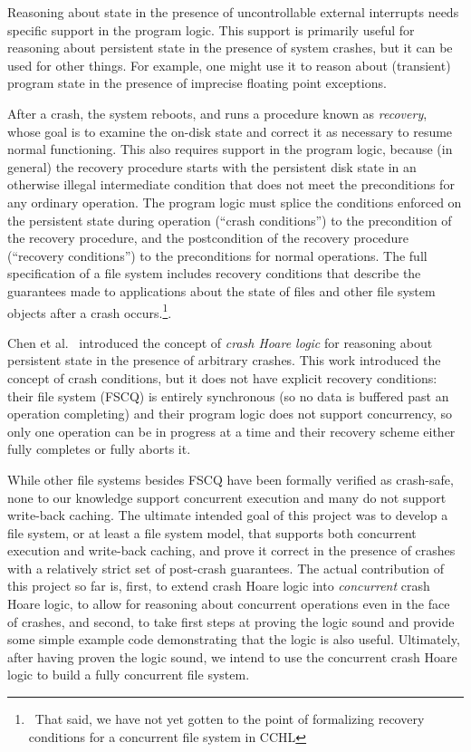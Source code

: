 Reasoning about state in the presence of uncontrollable external
interrupts needs
specific support in the program logic.
This support is primarily useful for reasoning about persistent state
in the presence of system crashes, but it can be used for other
things.
For example, one might use it to reason about (transient) program
state in the presence of imprecise floating point exceptions.

After a crash, the system reboots, and runs a procedure
known as \emph{recovery}, whose goal is to examine the on-disk state
and correct it as necessary to resume normal functioning.
This also requires support in the program logic, because (in general)
the recovery procedure starts with the persistent disk state in an
otherwise illegal intermediate condition that does not meet the
preconditions for any ordinary operation.
The program logic must splice the conditions enforced on the
persistent state during operation (``crash conditions'') to the
precondition of the recovery procedure, and the postcondition of the
recovery procedure (``recovery conditions'') to the preconditions for
normal operations.
The full specification of a file system includes recovery conditions that
describe the guarantees made to applications about the state of files and other
file system objects after a crash occurs.\footnote{\
That said, we have not yet
gotten to the point of formalizing recovery conditions for a concurrent file
system in CCHL}.

Chen et al.~\cite{chen2015using} introduced the concept of \emph{crash
Hoare logic} for reasoning about persistent state in the presence of
arbitrary crashes.
This work introduced the concept of crash conditions, but it does not
have explicit recovery conditions: their file system (FSCQ) is
entirely synchronous (so no data is buffered past an operation
completing) and their program logic does not support concurrency, so
only one operation can be in progress at a time and their recovery
scheme either fully completes or fully aborts it.

While other file systems besides FSCQ have been formally verified as
crash-safe, none to our knowledge support concurrent execution and
many do not support write-back caching.
The ultimate intended goal of this project was to develop a file
system, or at least a file system model, that supports both concurrent
execution and write-back caching, and prove it correct in the presence
of crashes with a relatively strict set of post-crash guarantees.
The actual contribution of this project so far is, first, to extend
crash Hoare logic into \emph{concurrent} crash Hoare logic, to allow
for reasoning about concurrent operations even in the face of crashes,
and second, to take first steps at proving the
logic sound and provide some simple example code demonstrating that
the logic is also useful.
Ultimately, after having proven the logic sound, we intend to use the
concurrent crash Hoare logic to build a fully concurrent file system.

